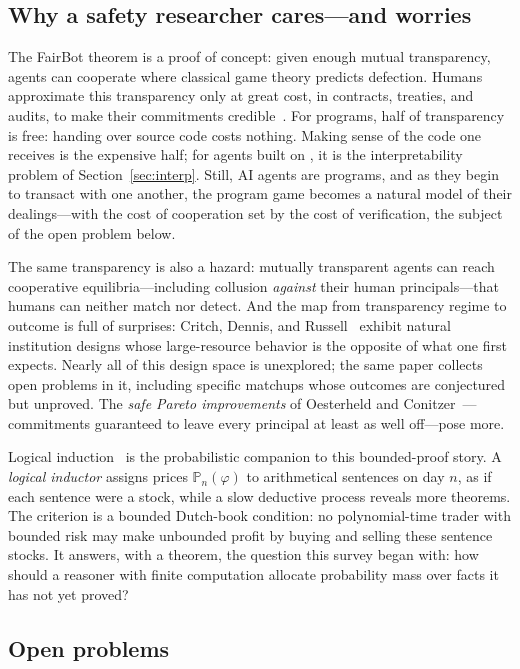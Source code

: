 \subsection{Why a safety researcher cares---and worries}

The FairBot theorem is a proof of concept: given enough mutual transparency, agents can cooperate where classical game theory predicts defection. Humans approximate this transparency only at great cost, in contracts, treaties, and audits, to make their commitments credible~\cite{schelling1960}. For programs, half of transparency is free: handing over source code costs nothing. Making sense of the code one receives is the expensive half; for agents built on , it is the interpretability problem of Section~\ref{sec:interp}. Still, AI agents are programs, and as they begin to transact with one another, the program game becomes a natural model of their dealings---with the cost of cooperation set by the cost of verification, the subject of the open problem below.

The same transparency is also a hazard: mutually transparent agents can reach cooperative equilibria---including collusion \emph{against} their human principals---that humans can neither match nor detect. And the map from transparency regime to outcome is full of surprises: Critch, Dennis, and Russell~\cite{critch2022} exhibit natural institution designs whose large-resource behavior is the opposite of what one first expects. Nearly all of this design space is unexplored; the same paper collects open problems in it, including specific matchups whose outcomes are conjectured but unproved. The \emph{safe Pareto improvements} of Oesterheld and Conitzer~\cite{oesterheld2021}---commitments guaranteed to leave every principal at least as well off---pose more.

Logical induction~\cite{garrabrant2016} is the probabilistic companion to this bounded-proof story. A \emph{logical inductor} assigns prices $\mathbb{P}_n(\varphi)$ to arithmetical sentences on day $n$, as if each sentence were a stock, while a slow deductive process reveals more theorems. The criterion is a bounded Dutch-book condition: no polynomial-time trader with bounded risk may make unbounded profit by buying and selling these sentence stocks. It answers, with a theorem, the question this survey began with: how should a reasoner with finite computation allocate probability mass over facts it has not yet proved?

\subsection{Open problems}


